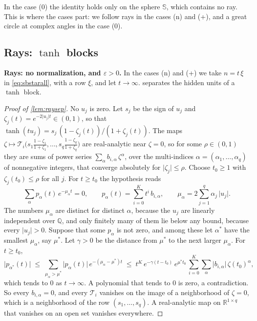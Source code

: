 \documentclass[10pt]{article}
\theoremstyle{definition}
\theoremstyle{remark}
\newcommand{\R}{\mathbb{R}}
\newcommand{\para}[1]{\smallskip\noindent\textbf{#1}\hspace{0.5em}}
\begin{document}
In the case (0) the identity holds only on the sphere $\mathbb S$, which contains no ray. This is where the cases part: we follow rays in the cases (n) and (+), and a great circle at complex angles in the case (0).

\subsection{Rays: \texorpdfstring{$\tanh$}{tanh} blocks}\label{app:raystanh}

\para{Rays: no normalization, and $\varepsilon > 0$.} In the cases (n) and (+) we take $n = t\,\xi$ in \eqref{eq:sbstarall}, with a row $\xi$, and let $t \to \infty$.  separates the hidden units of a $\tanh$ block.

\begin{proof}[Proof of \cref{lem:raysep}]
No $u_j$ is zero. Let $s_j$ be the sign of $u_j$ and $\zeta_j(t) = e^{-2\lvert u_j\rvert t} \in (0, 1)$, so that $\tanh(tu_j) = s_j\,(1 - \zeta_j(t))/(1 + \zeta_j(t))$. The maps $\zeta \mapsto \mathcal T_i\big(s_1\frac{1 - \zeta_1}{1 + \zeta_1}, \dots, s_q\frac{1 - \zeta_q}{1 + \zeta_q}\big)$ are real-analytic near $\zeta = 0$, so for some $\rho \in (0, 1)$ they are sums of power series $\sum_\alpha b_{i,\alpha}\,\zeta^\alpha$, over the multi-indices $\alpha = (\alpha_1, \dots, \alpha_q)$ of nonnegative integers, that converge absolutely for $\lvert\zeta_j\rvert \le \rho$. Choose $t_0 \ge 1$ with $\zeta_j(t_0) \le \rho$ for all $j$. For $t \ge t_0$ the hypothesis reads
\[
\sum_\alpha p_\alpha(t)\,e^{-\mu_\alpha t} = 0, \qquad p_\alpha(t) = \sum_{i=0}^{K} t^i\,b_{i,\alpha}, \qquad \mu_\alpha = 2\sum_{j=1}^{q}\alpha_j\,\lvert u_j\rvert .
\]
The numbers $\mu_\alpha$ are distinct for distinct $\alpha$, because the $u_j$ are linearly independent over $\mathbb Q$, and only finitely many of them lie below any bound, because every $\lvert u_j\rvert > 0$. Suppose that some $p_\alpha$ is not zero, and among these let $\alpha^*$ have the smallest $\mu_\alpha$, say $\mu^*$. Let $\gamma > 0$ be the distance from $\mu^*$ to the next larger $\mu_\alpha$. For $t \ge t_0$,
\[
\lvert p_{\alpha^*}(t)\rvert \;\le\; \sum_{\mu_\alpha > \mu^*}\lvert p_\alpha(t)\rvert\,e^{-(\mu_\alpha - \mu^*)t}
\;\le\; t^K\,e^{-\gamma(t - t_0)}\,e^{\mu^*t_0}\,\sum_{i=0}^{K}\sum_\alpha\lvert b_{i,\alpha}\rvert\,\zeta(t_0)^\alpha ,
\]
which tends to $0$ as $t \to \infty$. A polynomial that tends to $0$ is zero, a contradiction. So every $b_{i,\alpha} = 0$, and every $\mathcal T_i$ vanishes on the image of a neighborhood of $\zeta = 0$, which is a neighborhood of the row $(s_1, \dots, s_q)$. A real-analytic map on $\R^{1\times q}$ that vanishes on an open set vanishes everywhere.
\end{proof}
\end{document}
